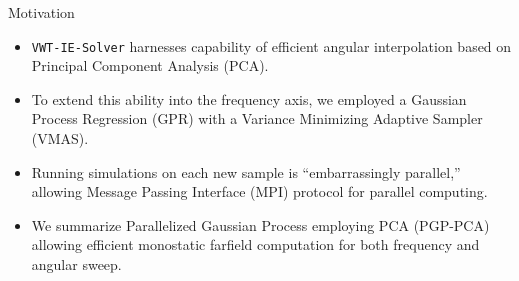 \begin{frame}{Motivation}

  \begin{itemize}
    \large \itemsep 1em
    \item \texttt{VWT-IE-Solver} harnesses capability of efficient angular interpolation based on Principal Component Analysis (PCA).
    \item To extend this ability into the frequency axis, we employed a Gaussian Process Regression (GPR) with a Variance Minimizing Adaptive Sampler (VMAS).
    \item Running simulations on each new sample is ``embarrassingly parallel,'' allowing Message Passing Interface (MPI) protocol for parallel computing.
    \item We summarize Parallelized Gaussian Process employing PCA (PGP-PCA) allowing efficient monostatic farfield computation for both frequency and angular sweep.
  \end{itemize}

\end{frame}
